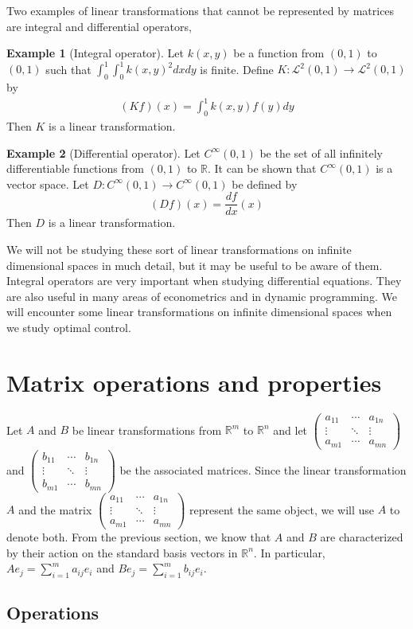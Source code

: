 \documentclass[12pt,reqno]{amsart}
\def\R{\mathbb{R}}
\newcommand{\gmatrix}[1]{\begin{pmatrix} {#1}_{11} & \cdots &
    {#1}_{1n} \\ \vdots & \ddots & \vdots \\ {#1}_{m1} & \cdots &
    {#1}_{mn} \end{pmatrix}}
\theoremstyle{definition}
\newtheorem{example}{Example}[section]
\begin{document}
Two examples of linear transformations that cannot be represented by
matrices are integral and differential operators,
\begin{example}[Integral operator]
  Let $k(x,y)$ be a function from $(0,1)$ to $(0,1)$ such that
  $\int_0^1 \int_0^1 k(x,y)^2 dx dy$ is finite.  Define
  $K:\mathcal{L}^2(0,1) \rightarrow \mathcal{L}^2(0,1)$ by
  \begin{align*}
    (K f) (x) = \int_0^1 k(x,y) f(y) dy
  \end{align*}
  Then $K$ is a linear transformation. 
\end{example}
\begin{example}[Differential operator]
  Let $C^\infty(0,1)$ be the set of all infinitely differentiable
  functions from $(0,1)$ to $\R$. It can be shown that
  $C^\infty(0,1)$ is a vector space. Let $D:C^\infty(0,1) \rightarrow
  C^\infty(0,1)$ be defined by 
  \[ (D f) (x) = \frac{d f}{dx}(x) \]
  Then $D$ is a linear transformation.
\end{example}
We will not be studying these sort of linear transformations on
infinite dimensional spaces in much detail, but it may be useful to be
aware of them. Integral operators are very important when studying
differential equations.  They are also useful in many areas of
econometrics and in dynamic programming. We will encounter some linear
transformations on infinite dimensional spaces when we study optimal
control. 

\section{Matrix operations and properties}

Let $A$ and $B$ be linear transformations from $\R^m$ to $\R^n$ and
let $\gmatrix{a}$ and $\gmatrix{b}$ be the associated matrices.  Since
the linear transformation $A$ and the matrix $\gmatrix{a}$ represent
the same object, we will use $A$ to denote both.  From the previous
section, we know that $A$ and $B$ are characterized by their action on
the standard basis vectors in $\R^n$. In particular, $A e_j =
\sum_{i=1}^m a_{ij} e_i$ and $B e_j = \sum_{i=1}^m b_{ij} e_i$. 

\subsection{Operations}
\end{document}
